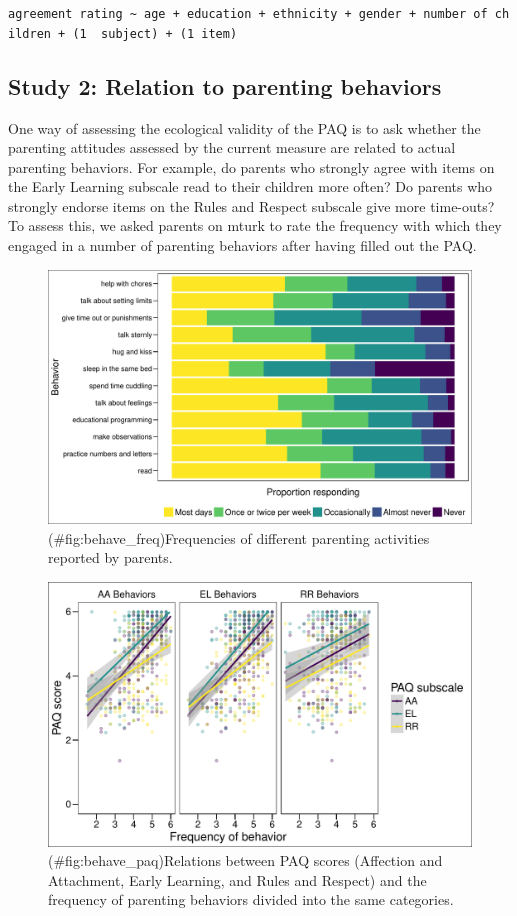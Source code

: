 \documentclass[floatsintext,man]{apa6}
\theoremstyle{definition}
\theoremstyle{definition}
\theoremstyle{definition}
\theoremstyle{remark}
\begin{document}
\texttt{agreement\ rating\ \textasciitilde{}\ age\ +\ education\ +\ ethnicity\ +\ gender\ +\ number\ of\ children\ +\ (1\ \textbar{}\ subject)\ +\ (1\textbar{}\ item)}

\subsection{Study 2: Relation to parenting
behaviors}\label{study-2-relation-to-parenting-behaviors}

One way of assessing the ecological validity of the PAQ is to ask
whether the parenting attitudes assessed by the current measure are
related to actual parenting behaviors. For example, do parents who
strongly agree with items on the Early Learning subscale read to their
children more often? Do parents who strongly endorse items on the Rules
and Respect subscale give more time-outs? To assess this, we asked
parents on mturk to rate the frequency with which they engaged in a
number of parenting behaviors after having filled out the PAQ.

\begin{figure}
\centering
\includegraphics{PAQ_paper_files/figure-latex/behave_freq-1.pdf}
\caption{(\#fig:behave\_freq)Frequencies of different parenting
activities reported by parents.}
\end{figure}

\begin{figure}
\centering
\includegraphics{PAQ_paper_files/figure-latex/behave_paq-1.pdf}
\caption{(\#fig:behave\_paq)Relations between PAQ scores (Affection and
Attachment, Early Learning, and Rules and Respect) and the frequency of
parenting behaviors divided into the same categories.}
\end{figure}
\end{document}
